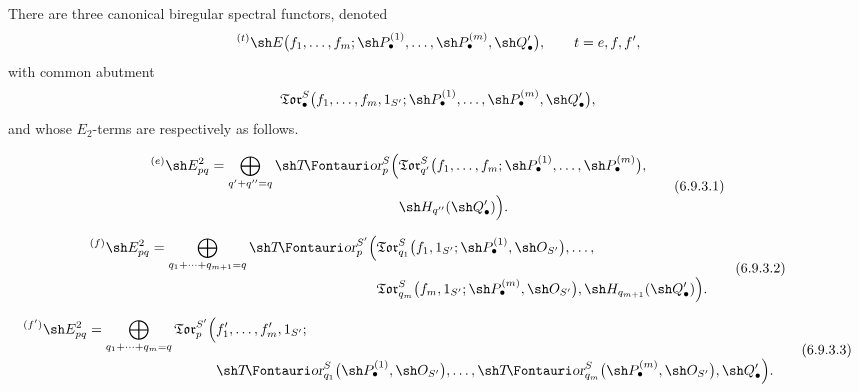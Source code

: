 \begin{proposition}[6.9.3]
\label{III.6.9.3}
There are three canonical biregular spectral functors, denoted
\[
  {}^{(t)}\sh E
  \bigl(
    f_1,\ldots,f_m;
    \sh P_\bullet^{(1)},\ldots,\sh P_\bullet^{(m)},
    \sh Q_\bullet'
  \bigr),
  \qquad
  t=e,f,f',
\]
with common abutment
\[
  \mathfrak{Tor}_\bullet^S
  \bigl(
    f_1,\ldots,f_m,1_{S'};
    \sh P_\bullet^{(1)},\ldots,\sh P_\bullet^{(m)},
    \sh Q_\bullet'
  \bigr),
\]
and whose $E_2$-terms are respectively as follows.

\begin{env}[6.9.3.1]
\label{III.6.9.3.1}
\[
\begin{split}
  {}^{(e)}\sh E_{pq}^2
  =
  \bigoplus_{q'+q''=q}
  \shTor_p^S
  \Bigl(
    &
    \mathfrak{Tor}_{q'}^S
    \bigl(
      f_1,\ldots,f_m;
      \sh P_\bullet^{(1)},\ldots,\sh P_\bullet^{(m)}
    \bigr),
    \\
    &
    \sh H_{q''}(\sh Q_\bullet')
  \Bigr).
\end{split}
  \tag{6.9.3.1}\label{III.6.9.3.1.eq}
\]
\end{env}

\begin{env}[6.9.3.2]
\label{III.6.9.3.2}
\[
\begin{split}
  {}^{(f)}\sh E_{pq}^2
  =
  \bigoplus_{q_1+\cdots+q_{m+1}=q}
  \shTor_p^{S'}
  \Bigl(
    &
    \mathfrak{Tor}_{q_1}^S
    \bigl(
      f_1,1_{S'};
      \sh P_\bullet^{(1)},\sh O_{S'}
    \bigr),
    \ldots,
    \\
    &
    \mathfrak{Tor}_{q_m}^S
    \bigl(
      f_m,1_{S'};
      \sh P_\bullet^{(m)},\sh O_{S'}
    \bigr),
    \sh H_{q_{m+1}}(\sh Q_\bullet')
  \Bigr).
\end{split}
  \tag{6.9.3.2}\label{III.6.9.3.2.eq}
\]
\end{env}

\begin{env}[6.9.3.3]
\label{III.6.9.3.3}
\[
\begin{split}
  {}^{(f')}\sh E_{pq}^2
  =
  \bigoplus_{q_1+\cdots+q_m=q}
  \mathfrak{Tor}_p^{S'}
  \Bigl(
    &
    f_1',\ldots,f_m',1_{S'};
    \\
    &
    \shTor_{q_1}^S
    \bigl(
      \sh P_\bullet^{(1)},\sh O_{S'}
    \bigr),
    \ldots,
    \shTor_{q_m}^S
    \bigl(
      \sh P_\bullet^{(m)},\sh O_{S'}
    \bigr),
    \sh Q_\bullet'
  \Bigr).
\end{split}
  \tag{6.9.3.3}\label{III.6.9.3.3.eq}
\]
\end{env}
\end{proposition}

